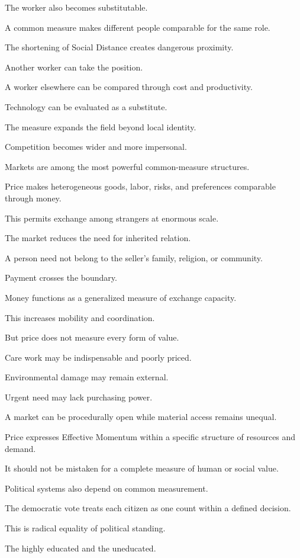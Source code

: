 The worker also becomes substitutable.

A common measure makes different people comparable for the same role.

The shortening of Social Distance creates dangerous proximity.

Another worker can take the position.

A worker elsewhere can be compared through cost and productivity.

Technology can be evaluated as a substitute.

The measure expands the field beyond local identity.

Competition becomes wider and more impersonal.

Markets are among the most powerful common-measure structures.

Price makes heterogeneous goods, labor, risks, and preferences comparable through money.

This permits exchange among strangers at enormous scale.

The market reduces the need for inherited relation.

A person need not belong to the seller’s family, religion, or community.

Payment crosses the boundary.

Money functions as a generalized measure of exchange capacity.

This increases mobility and coordination.

But price does not measure every form of value.

Care work may be indispensable and poorly priced.

Environmental damage may remain external.

Urgent need may lack purchasing power.

A market can be procedurally open while material access remains unequal.

Price expresses Effective Momentum within a specific structure of resources and demand.

It should not be mistaken for a complete measure of human or social value.

Political systems also depend on common measurement.

The democratic vote treats each citizen as one count within a defined decision.

This is radical equality of political standing.

The highly educated and the uneducated.


